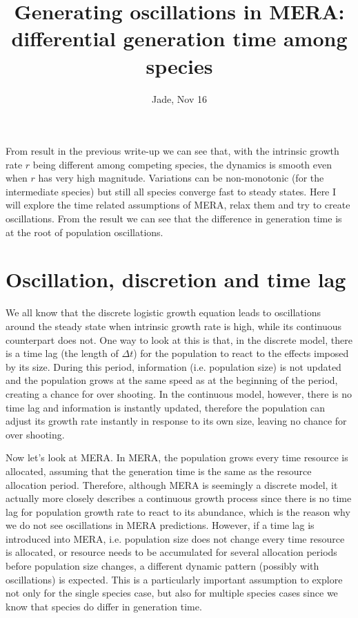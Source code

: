 \documentclass[12pt]{article}
\date{}
\title{\Large \textbf{Generating oscillations in MERA: differential generation time among species}}
\author{Jade, Nov 16}
\begin{document}
\maketitle
\raggedright
\large
\setlength{\parindent}{15pt}

From result in the previous write-up we can see that, with the intrinsic growth rate $r$ being different among competing species, the dynamics is smooth even when $r$ has very high magnitude. Variations can be non-monotonic (for the intermediate species) but still all species converge fast to steady states. Here I will explore the time related assumptions of MERA, relax them and try to create oscillations. From the result we can see that the difference in generation time is at the root of population oscillations.

\section{Oscillation, discretion and time lag}
We all know that the discrete logistic growth equation leads to oscillations around the steady state when intrinsic growth rate is high, while its continuous counterpart does not. One way to look at this is that, in the discrete model, there is a time lag (the length of $\Delta t$) for the population to react to the effects imposed by its size. During this period, information (i.e. population size) is not updated and the population grows at the same speed as at the beginning of the period, creating a chance for over shooting. In the continuous model, however, there is no time lag and information is instantly updated, therefore the population can adjust its growth rate instantly in response to its own size, leaving no chance for over shooting. 

Now let's look at MERA. In MERA, the population grows every time resource is allocated, assuming that the generation time is the same as the resource allocation period. Therefore, although MERA is seemingly a discrete model, it actually more closely describes a continuous growth process since there is no time lag for population growth rate to react to its abundance, which is the reason why we do not see oscillations in MERA predictions. However, if a time lag is introduced into MERA, i.e. population size does not change every time resource is allocated, or resource needs to be accumulated for several allocation periods before population size changes, a different dynamic pattern (possibly with oscillations) is expected. This is a particularly important assumption to explore not only for the single species case, but also for multiple species cases since we know that species do differ in generation time.
\end{document}
